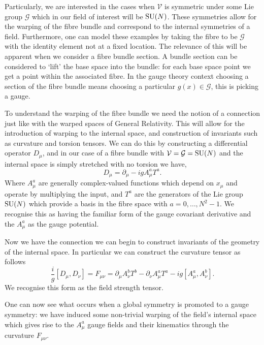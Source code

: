 Particularly, we are interested in the cases when $\mathcal{V}$ is symmetric under some Lie group $\mathcal{G}$ which in our field of interest will be ${\mathrm{SU}(N)}$. 
These symmetries allow for the warping of the fibre bundle and correspond to the internal symmetries of a field. 
Furthermore, one can model these examples by taking the fibre to be $\mathcal{G}$ with the identity element not at a fixed location. 
The relevance of this will be apparent when we consider a fibre bundle section. A bundle section can be considered to `lift' the base space into the bundle: for each base space point we get a point within the associated fibre. In the gauge theory context choosing a section of the fibre bundle means choosing a particular $g(x)\in\mathcal{G}$, this is picking a gauge. 



To understand the warping of the fibre bundle we need the notion of a connection just like with the warped spaces of General Relativity.
This will allow for the introduction of warping to the internal space, and construction of invariants such as curvature and torsion tensors.
We can do this by constructing a differential operator $D_{\mu}$, and in our case of a fibre bundle with $\mathcal{V}=\mathcal{G}={\mathrm{SU}(N)}$ and the internal space is simply stretched with no torsion we have,
\begin{equation}
\label{eq:theory:g_connection}
D_{\mu} = \partial_{\mu} - igA_{\mu}^{a} T^{a}.
\end{equation}
Where $A_{\mu}^{a}$ are generally complex-valued functions which depend on $x_{\mu}$ and operate by multiplying the input, and $T^{a}$ are the generators of the Lie group ${\mathrm{SU}(N)}$ which provide a basis in the fibre space with $a = 0,\ldots,N^{2}-1$.
We recognise this as having the familiar form of the gauge covariant derivative and the $A_{\mu}^{a}$ as the gauge potential. 


Now we have the connection we can begin to construct invariants of the geometry of the internal space. In particular we can construct the curvature tensor as follows
\begin{equation}
    \label{eq:theory:g_curvature}
    \frac{i}{g}[D_{\mu},D_{\nu}] = F_{\mu\nu} = \partial_{\mu} A^{b}_{\nu} T^{b} - \partial_{\nu} A^{a}_{\mu} T^{a} - ig[A^{a}_{\mu}, A^{b}_{\nu}].
\end{equation}
We recognise this form as the field strength tensor.

One can now see what occurs when a global symmetry is promoted to a gauge symmetry: we have induced some non-trivial warping of the field's internal space which gives rise to the $A^{a}_{\mu}$ gauge fields and their kinematics through the curvature $F_{\mu\nu}$.




